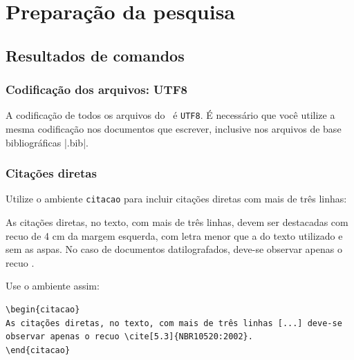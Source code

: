 \part{Preparação da pesquisa}


\chapter{Resultados de comandos}\label{cap_exemplos}


\section{Codificação dos arquivos: UTF8}

A codificação de todos os arquivos do \abnTeX\ é \texttt{UTF8}. É necessário que
você utilize a mesma codificação nos documentos que escrever, inclusive nos
arquivos de base bibliográficas |.bib|.

\section{Citações diretas}
\label{sec-citacao}

Utilize o ambiente \texttt{citacao} para incluir
citações diretas com mais de três linhas:

\begin{citacao}
As citações diretas, no texto, com mais de três linhas, devem ser
destacadas com recuo de 4 cm da margem esquerda, com letra menor que a do texto
utilizado e sem as aspas. No caso de documentos datilografados, deve-se
observar apenas o recuo \cite[5.3]{NBR10520:2002}.
\end{citacao}

Use o ambiente assim:
\begin{verbatim}
\begin{citacao}
As citações diretas, no texto, com mais de três linhas [...] deve-se
observar apenas o recuo \cite[5.3]{NBR10520:2002}.
\end{citacao}
\end{verbatim}

